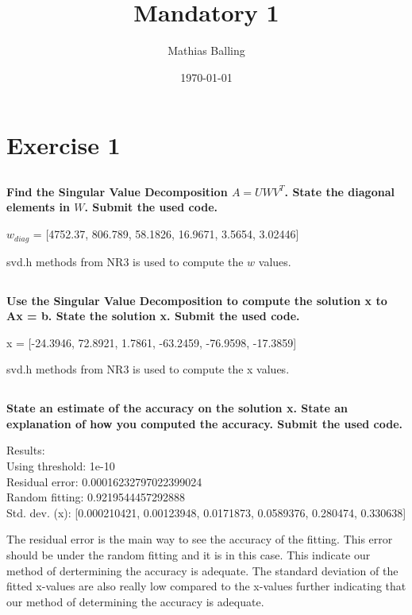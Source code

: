 \documentclass{article}
\title{Mandatory 1}
\author{Mathias Balling}
\date{\today}
\begin{document}
\maketitle

\section{Exercise 1}

\subsection{}
\textbf{Find the Singular Value Decomposition $A = UWV^T$. State the diagonal elements in $W$. Submit the used code.}

$w_{diag}$ = [4752.37, 806.789, 58.1826, 16.9671, 3.5654, 3.02446]

svd.h methods from NR3 is used to compute the $w$ values.
\subsection{}
\textbf{Use the Singular Value Decomposition to compute the solution x to Ax = b. State the solution x. Submit the used code.}

x = [-24.3946, 72.8921, 1.7861, -63.2459, -76.9598, -17.3859]

svd.h methods from NR3 is used to compute the x values.
\subsection{} 
\textbf{State an estimate of the accuracy on the solution x. State an explanation of how you computed the accuracy. Submit the used code.}

Results:\\
Using threshold: 1e-10\\
Residual error: 0.00016232797022399024\\
Random fitting: 0.9219544457292888\\
Std. dev. (x): [0.000210421, 0.00123948, 0.0171873, 0.0589376, 0.280474, 0.330638]

The residual error is the main way to see the accuracy of the fitting. This error should be under the random fitting and it is in this case. This indicate our method of dertermining the accuracy is adequate.
The standard deviation of the fitted x-values are also really low compared to the x-values further indicating that our method of determining the accuracy is adequate.
\end{document}
